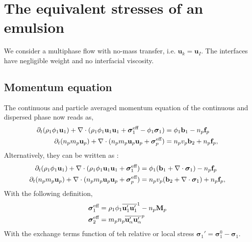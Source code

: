 \section{The equivalent stresses of an emulsion}

We consider a multiphase flow with no-mass transfer, i.e. $\textbf{u}_k=\textbf{u}_I$.
The interfaces have negligible weight and no interfacial viscosity. 

\subsection{Momentum equation}
The  continuous and particle averaged momentum equation of the continuous and dispersed phase now reads as, 
\begin{align*}
    \partial_t (\rho_1\phi_1 \textbf{u}_1 )
    + \mathbf{\nabla}\cdot (\rho_1\phi_1 \textbf{u}_1  \textbf{u}_1
    + \bm{\sigma}^\text{eff}_1 
    - \phi_1 \bm{\sigma}_1)
    &= 
    \phi_1 \textbf{b}_1
    - n_p \textbf{f}_p \\
    \partial_t (n_p m_p \textbf{u}_p)
    + \mathbf{\nabla}\cdot (
        n_p m_p \textbf{u}_p\textbf{u}_p
        + \bm{\sigma}^\text{eff}_p
        )
    &= 
     n_p v_p 
      \textbf{b}_2
    + n_p \textbf{f}_p ,
\end{align*}
Alternatively, they can be written as :
\begin{align*}
    \partial_t (\rho_1\phi_1 \textbf{u}_1 )
    + \mathbf{\nabla}\cdot (\rho_1\phi_1 \textbf{u}_1  \textbf{u}_1
    + \bm{\sigma}^\text{eff}_1 )
    &= 
    \phi_1( \textbf{b}_1  +\mathbf{\nabla}\cdot  \bm{\sigma}_1)
    - n_p \textbf{f}_p \\
    \partial_t (n_p m_p \textbf{u}_p)
    + \mathbf{\nabla}\cdot (
        n_p m_p \textbf{u}_p\textbf{u}_p
        + \bm{\sigma}^\text{eff}_p
        )
    &= 
     n_p v_p (
      \textbf{b}_2
    + \mathbf{\nabla}\cdot \bm{\sigma}_1 )
    + n_p \textbf{f}_p ,
\end{align*}
With the following definition, 
\begin{align*}
    \bm{\sigma}^\text{eff}_1
    &=\rho_1 \phi_1 \overline{\textbf{u}_1'\textbf{u}_1'}^1
    - n_p \textbf{M}_p 
    \\
    \bm{\sigma}^\text{eff}_2
    &= m_p n_p\overline{ \textbf{u}_\alpha'\textbf{u}_\alpha'}^{p} 
\end{align*}
With the exchange terms function of teh relative or local stress $\bm{\sigma}_1'=\bm{\sigma}_1^0 - \bm{\sigma}_1$. 

